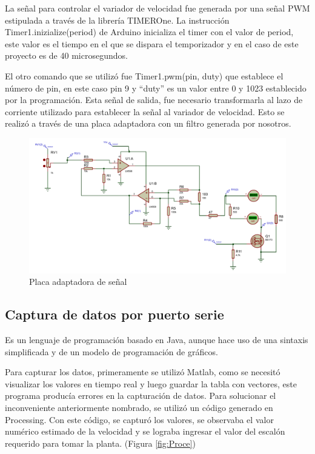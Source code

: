 La señal para controlar el variador de velocidad fue generada por una señal PWM estipulada a través de la librería TIMEROne. La instrucción Timer1.inizialize(period)
 de Arduino inicializa el timer con el valor de period, este valor es el tiempo en el que se dispara el temporizador y en el caso de este proyecto es de 40 microsegundos.
 
El otro comando que se utilizó fue Timer1.pwm(pin, duty) que establece el número de pin, en este caso pin 9 y “duty” es un valor entre 0 y 1023 establecido por la programación. 
Esta señal de salida, fue necesario transformarla al lazo de corriente utilizado para establecer la señal al variador de velocidad. Esto se realizó a través de una placa adaptadora con un filtro generada por nosotros.
\begin{figure}[htbp]
	\centering
	\includegraphics[width=0.8\linewidth]{imagenes/plano_DC.pdf}
	\caption{Placa adaptadora de señal}
	\label{fig:adapt}
\end{figure}

\subsection{Captura de datos por puerto serie}
\begin{tcolorbox}[colback=blue!5!white,colframe=blue!75!black,title=Processing]
    Es un lenguaje de programación basado en Java, aunque hace uso de una sintaxis simplificada y de un modelo de programación de gráficos.
    \end{tcolorbox}
Para capturar los datos, primeramente se utilizó Matlab, como se necesitó visualizar los valores en tiempo real y luego guardar la tabla con vectores, este programa producía errores en la capturación de datos.
Para solucionar el inconveniente anteriormente nombrado, se utilizó un código generado en Processing. Con este código, se capturó los valores, se observaba el valor numérico estimado de la velocidad y se lograba ingresar el valor del escalón requerido para tomar la planta. (Figura \ref{fig:Proce})

